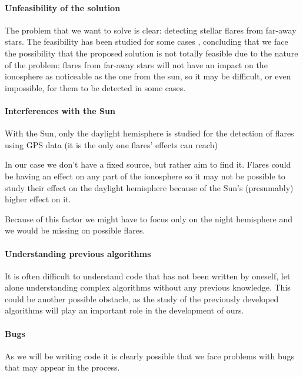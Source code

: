 \documentclass[12pt]{article}
\begin{document}
\paragraph{Unfeasibility of the solution}

The problem that we want to solve is clear: detecting stellar flares from far-away stars. The feasibility has been studied for some cases \cite{martinez2016first}, concluding that we face the possibility that the proposed solution is not totally feasible due to the nature of the problem: flares from far-away stars will not have an impact on the ionosphere as noticeable as the one from the sun, so it may be difficult, or even impossible, for them to be detected in some cases.

\paragraph{Interferences with the Sun}

With the Sun, only the daylight hemisphere is studied for the detection of flares using GPS data (it is the only one flares' effects can reach)

In our case we don’t have a fixed source, but rather aim to find it. Flares could be having an effect on any part of the ionosphere so it may not be possible to study their effect on the daylight hemisphere because of the Sun’s (presumably) higher effect on it. 

Because of this factor we might have to focus only on the night hemisphere and we would be missing on possible flares.

\paragraph{Understanding previous algorithms}

It is often difficult to understand code that has not been written by oneself, let alone understanding complex algorithms without any previous knowledge. This could be another possible obstacle, as the study of the previously developed algorithms will play an important role in the development of ours.

\paragraph{Bugs}

As we will be writing code it is clearly possible that we face problems with bugs that may appear in the process.
\end{document}

